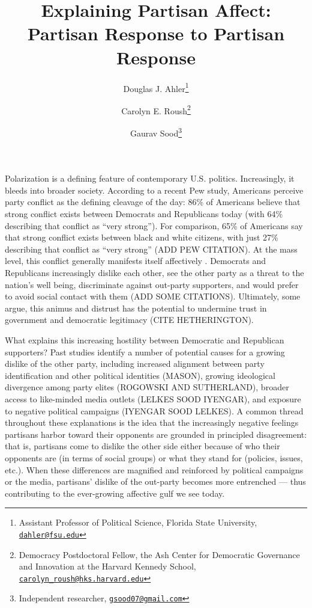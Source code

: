 \documentclass[12pt, letterpaper]{article}
\title{Explaining Partisan Affect: Partisan Response to Partisan Response}
\author{Douglas J. Ahler\thanks{Assistant Professor of Political Science, Florida State University, \href{mailto:dahler@fsu.edu}{\texttt{dahler@fsu.edu}}} \and Carolyn E. Roush\thanks{Democracy Postdoctoral Fellow, the Ash Center for Democratic Governance and Innovation at the Harvard Kennedy School, \href{mailto:carolyn_roush@hks.harvard.edu}{\texttt{carolyn\_roush@hks.harvard.edu}}} \and Gaurav Sood\thanks{Independent researcher, \href{gsood07@gmail.com}{\texttt{gsood07@gmail.com}}}}
\begin{document}
\maketitle
\thispagestyle{empty}

\begin{abstract}

\noindent 

\end{abstract}

\newpage

\doublespacing
Polarization is a defining feature of contemporary U.S. politics. Increasingly, it bleeds into broader society. According to a recent Pew study, Americans perceive party conflict as the defining cleavage of the day: 86\% of Americans believe that strong conflict exists between Democrats and Republicans today (with 64\% describing that conflict as ``very strong''). For comparison, 65\% of Americans say that strong conflict exists between black and white citizens, with just 27\% describing that conflict as ``very strong'' (ADD PEW CITATION). At the mass level, this conflict generally manifests itself affectively \citep{IyengarSoodLelkes2012}. Democrats and Republicans increasingly dislike each other, see the other party as a threat to the nation's well being, discriminate against out-party supporters, and would prefer to avoid social contact with them (ADD SOME CITATIONS). Ultimately, some argue, this animus and distrust has the potential to undermine trust in government and democratic legitimacy (CITE HETHERINGTON).

What explains this increasing hostility between Democratic and Republican supporters? Past studies identify a number of potential causes for a growing dislike of the other party, including increased alignment between party identification and other political identities (MASON), growing ideological divergence among party elites (ROGOWSKI AND SUTHERLAND), broader access to like-minded media outlets (LELKES SOOD IYENGAR), and exposure to negative political campaigns (IYENGAR SOOD LELKES). A common thread throughout these explanations is the idea that the increasingly negative feelings partisans harbor toward their opponents are grounded in principled disagreement: that is, partisans come to dislike the other side either because of who their opponents are (in terms of social groups) or what they stand for (policies, issues, etc.). When these differences are magnified and reinforced by political campaigns or the media, partisans' dislike of the out-party becomes more entrenched --- thus contributing to the ever-growing affective gulf we see today. 
\end{document}
